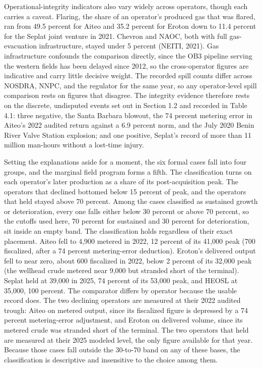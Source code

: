 \documentclass[twoside,fontset=lmodern]{mitthesis}
\begin{document}
Operational-integrity indicators also vary widely across operators,
though each carries a caveat. Flaring, the share of an operator's
produced gas that was flared, ran from 49.5 percent for Aiteo and 35.2
percent for Eroton down to 11.4 percent for the Seplat joint venture in
2021. Chevron and NAOC, both with full gas-evacuation infrastructure,
stayed under 5 percent (NEITI, 2021). Gas infrastructure confounds the
comparison directly, since the OB3 pipeline serving the western fields
has been delayed since 2012, so the cross-operator figures are
indicative and carry little decisive weight. The recorded spill counts
differ across NOSDRA, NNPC, and the regulator for the same year, so any
operator-level spill comparison rests on figures that disagree. The
integrity evidence therefore rests on the discrete, undisputed events
set out in Section 1.2 and recorded in Table 4.1: three negative, the
Santa Barbara blowout, the 74 percent metering error in Aiteo's 2022
audited return against a 6.9 percent norm, and the July 2020 Benin River
Valve Station explosion; and one positive, Seplat's record of more than
11 million man-hours without a lost-time injury.

Setting the explanations aside for a moment, the six formal cases fall
into four groups, and the marginal field program forms a fifth. The
classification turns on each operator's later production as a share of
its post-acquisition peak. The operators that declined bottomed below 15
percent of peak, and the operators that held stayed above 70 percent.
Among the cases classified as sustained growth or deterioration, every
one falls either below 30 percent or above 70 percent, so the cutoffs
used here, 70 percent for sustained and 30 percent for deterioration,
sit inside an empty band. The classification holds regardless of their
exact placement. Aiteo fell to 4,900 metered in 2022, 12 percent of its
41,000 peak (700 fiscalized, after a 74 percent metering-error
deduction). Eroton's delivered output fell to near zero, about 600
fiscalized in 2022, below 2 percent of its 32,000 peak (the wellhead
crude metered near 9,000 but stranded short of the terminal). Seplat
held at 39,000 in 2025, 74 percent of its 53,000 peak, and HEOSL at
35,000, 100 percent. The comparator differs by operator because the
usable record does. The two declining operators are measured at their
2022 audited trough: Aiteo on metered output, since its fiscalized
figure is depressed by a 74 percent metering-error adjustment, and
Eroton on delivered volume, since its metered crude was stranded short
of the terminal. The two operators that held are measured at their 2025
modeled level, the only figure available for that year. Because those
cases fall outside the 30-to-70 band on any of these bases, the
classification is descriptive and insensitive to the choice among them.
\end{document}
